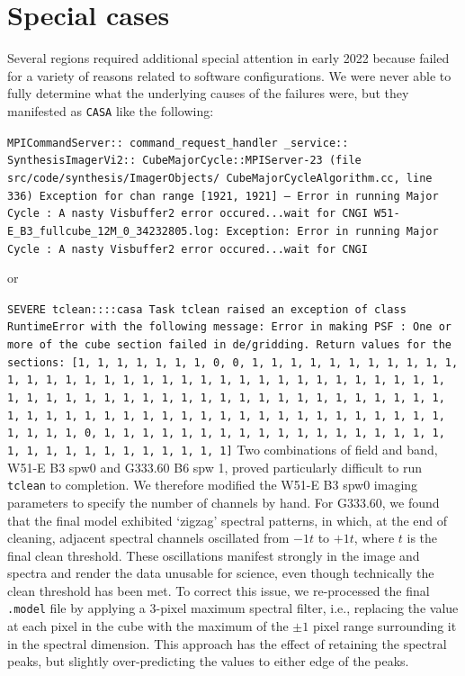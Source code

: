 
\section{Special cases}

Several regions required additional special attention in early 2022 because \tclean failed for a variety of reasons related to software configurations.
We were never able to fully determine what the underlying causes of the failures were, but they manifested as \texttt{CASA} like the following:

\noindent 
\texttt{MPICommandServer:: 
command\_request\_handler
\_service:: SynthesisImagerVi2:: CubeMajorCycle::MPIServer-23 (file src/code/synthesis/ImagerObjects/ CubeMajorCycleAlgorithm.cc, line 336)      Exception for chan range [1921, 1921] ---   Error in running Major Cycle : A nasty Visbuffer2 error occured...wait for CNGI
W51-E\_B3\_fullcube\_12M\_0\_34232805.log: Exception: Error in running Major Cycle : A nasty Visbuffer2 error occured...wait for CNGI}

or

\noindent
\texttt{SEVERE  tclean::::casa  Task tclean raised an exception of class RuntimeError with the following message: Error in making PSF : One or more  of the cube section failed in de/gridding. Return values for the sections: [1, 1, 1, 1, 1, 1, 1, 0, 0, 1, 1, 1, 1, 1, 1, 1, 1, 1, 1, 1, 1, 1, 1, 1, 1, 1, 1, 1, 1, 1, 1, 1, 1, 1, 1, 1, 1, 1, 1, 1, 1, 1, 1, 1, 1, 1, 1, 1, 1, 1, 1, 1, 1, 1, 1, 1, 1, 1, 1, 1, 1, 1, 1, 1, 1, 1, 1, 1, 1, 1, 1, 1, 1, 1, 1, 1, 1, 1, 1, 1, 1, 1, 1, 1, 1, 1, 1, 1, 1, 1, 1, 1, 1, 0, 1, 1, 1, 1, 1, 1, 1, 1, 1, 1, 1, 1, 1, 1, 1, 1, 1, 1, 1, 1, 1, 1, 1, 1, 1, 1, 1, 1, 1, 1]}
\newline
Two combinations of field and band, W51-E B3 spw0 and G333.60 B6 spw 1, proved particularly difficult to run \texttt{tclean} to completion.
We therefore modified the W51-E B3 spw0 imaging parameters to specify the number of channels by hand.
For G333.60, we found that the final model exhibited `zigzag' spectral patterns, in which, at the end of cleaning, adjacent spectral channels oscillated from $-1t$ to $+1t$, where $t$ is the final clean threshold.
These oscillations manifest strongly in the image and spectra and render the data unusable for science, even though technically the clean threshold has been met.
To correct this issue, we re-processed the final \texttt{.model} file by applying a 3-pixel maximum spectral filter, i.e., replacing the value at each pixel in the cube with the maximum of the $\pm1$ pixel range surrounding it in the spectral dimension.
This approach has the effect of retaining the spectral peaks, but slightly over-predicting the values to either edge of the peaks.